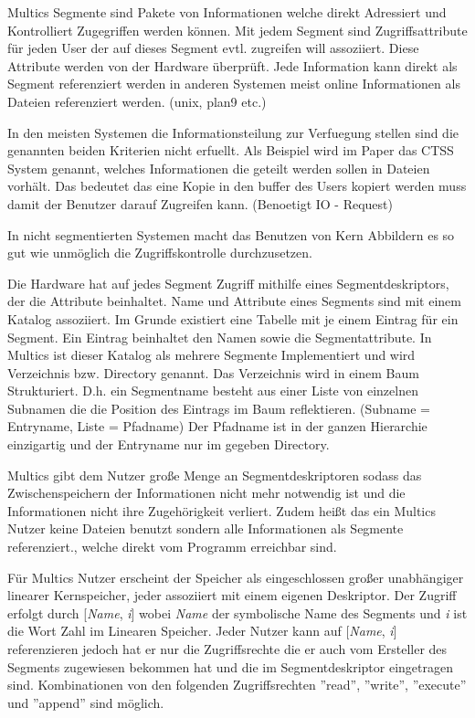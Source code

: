 \documentclass[9pt,technote]{IEEEtran}
\begin{document}
		    Multics Segmente sind Pakete von Informationen welche direkt Adressiert und Kontrolliert Zugegriffen werden k\"onnen.
		    Mit jedem Segment sind Zugriffsattribute f\"ur jeden User der auf dieses Segment evtl. zugreifen will assoziiert.
		    Diese Attribute werden von der Hardware \"uberpr\"uft. Jede Information kann direkt als Segment referenziert werden
		    in anderen Systemen meist online Informationen als Dateien referenziert werden. (unix, plan9 etc.)
		  
		    In den meisten Systemen die Informationsteilung zur Verfuegung stellen sind die genannten beiden Kriterien nicht erfuellt.
		    Als Beispiel wird im Paper \cite{inproc:multics} das CTSS System genannt, welches Informationen die geteilt werden sollen in Dateien vorh\"alt.
		    Das bedeutet das eine Kopie in den buffer des Users kopiert werden muss damit der Benutzer darauf Zugreifen kann. (Benoetigt IO - Request)
		  
		    In nicht segmentierten Systemen macht das Benutzen von Kern Abbildern es so gut wie unm\"oglich die Zugriffskontrolle durchzusetzen.
		  
        Die Hardware hat auf jedes Segment Zugriff mithilfe eines Segmentdeskriptors, der die Attribute beinhaltet.
		    Name und Attribute eines Segments sind mit einem Katalog assoziiert. Im Grunde existiert eine Tabelle mit je einem Eintrag f\"ur ein Segment. 
		    Ein Eintrag beinhaltet den Namen sowie die Segmentattribute. In Multics ist dieser Katalog als mehrere
		    Segmente Implementiert und wird Verzeichnis bzw. Directory genannt. Das Verzeichnis wird in einem Baum Strukturiert.
		    D.h. ein Segmentname besteht aus einer Liste von einzelnen Subnamen die die Position des Eintrags im Baum reflektieren.
		    (Subname = Entryname, Liste = Pfadname)
		    Der Pfadname ist in der ganzen Hierarchie einzigartig und der Entryname nur im gegeben Directory.
		     
		    Multics gibt dem Nutzer gro\ss e Menge an Segmentdeskriptoren sodass das Zwischenspeichern der Informationen nicht mehr notwendig ist und 
		    die Informationen nicht ihre Zugeh\"origkeit verliert. Zudem hei\ss t das ein Multics Nutzer keine Dateien benutzt sondern alle Informationen
		    als Segmente referenziert., welche direkt vom Programm erreichbar sind.
		 
        F\"ur Multics Nutzer erscheint der Speicher als eingeschlossen gro\ss er unabh\"angiger linearer Kernspeicher,
        jeder assoziiert mit einem eigenen Deskriptor. 
        Der Zugriff erfolgt durch [\textit{Name}, \textit{i}] wobei \textit{Name} der symbolische Name des Segments und \textit{i} ist die Wort Zahl
        im Linearen Speicher. Jeder Nutzer kann auf [\textit{Name}, \textit{i}] referenzieren jedoch hat er nur die Zugriffsrechte die er auch vom Ersteller
	      des Segments zugewiesen bekommen hat und die im Segmentdeskriptor eingetragen sind.
	      Kombinationen von den folgenden Zugriffsrechten ''read'', ''write'', ''execute'' und ''append'' sind m\"oglich.
	 
\end{document}
